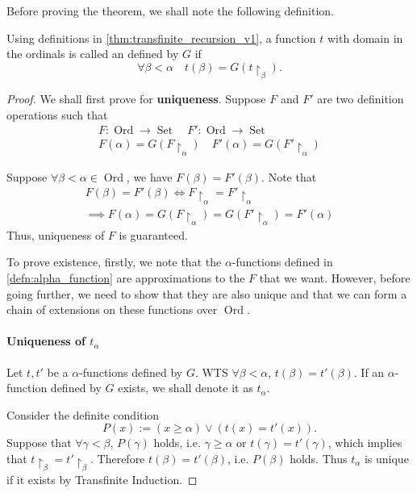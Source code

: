 \documentclass[notoc,notitlepage]{tufte-book}
\DeclareMathOperator{\Ord}{Ord }
\DeclareMathOperator{\Set}{Set }
\begin{document}
Before proving the theorem, we shall note the following definition.

\begin{defn}
\label{defn:alpha_function}
  Using definitions in \cref{thm:transfinite_recursion_v1}, a function $t$ with domain in the ordinals is called an  defined by $G$ if
  \begin{equation*}
    \forall \beta < \alpha \quad t(\beta) = G(t \restriction_\beta).
  \end{equation*}
\end{defn}

\begin{proof}
  We shall first prove for \textbf{uniqueness}. Suppose $F$ and $F'$ are two definition operations such that
  \begin{gather*}
    F: \Ord \to \Set \quad F' : \Ord \to \Set \\
    F(\alpha) = G(F\restriction_\alpha) \quad F'(\alpha) = G(F'\restriction_\alpha)
  \end{gather*}

  Suppose $\forall \beta < \alpha \in \Ord$, we have $F(\beta) = F'(\beta)$. Note that
  \begin{gather*}
    F(\beta) = F'(\beta) \iff F\restriction_\alpha = F'\restriction_\alpha \\
    \implies F(\alpha) = G(F\restriction_\alpha) = G(F'\restriction_\alpha) = F'(\alpha)
  \end{gather*}
  Thus, uniqueness of $F$ is guaranteed.

  To prove existence, firstly, we note that the $\alpha$-functions defined in \cref{defn:alpha_function} are approximations to the $F$ that we want. However, before going further, we need to show that they are also unique and that we can form a chain of extensions on these functions over $\Ord$.

  \paragraph{Uniqueness of $t_\alpha$} Let $t, t'$ be a $\alpha$-functions defined by $G$. WTS $\forall \beta < \alpha$, $t(\beta) = t'(\beta)$. If an $\alpha$-function defined by $G$ exists, we shall denote it as $t_\alpha$.

  Consider the definite condition
  \begin{equation*}
    P(x) := ( x \geq \alpha ) \lor ( t(x) = t'(x) ).
  \end{equation*}
  Suppose that $\forall \gamma < \beta$, $P(\gamma)$ holds, i.e. $\gamma \geq \alpha$ or $t(\gamma) = t'(\gamma)$, which implies that $t\restriction_\beta = t'\restriction_\beta$. Therefore $t(\beta) = t'(\beta)$, i.e. $P(\beta)$ holds. Thus $t_\alpha$ is unique if it exists by Transfinite Induction.


\end{proof}
\end{document}
